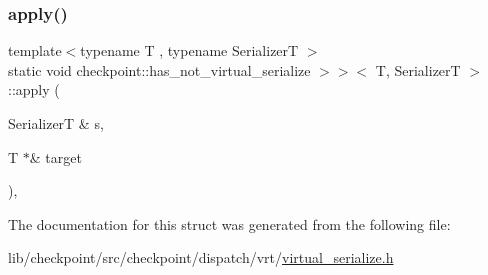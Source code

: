 \subsubsection{\texorpdfstring{apply()}{apply()}}
{\footnotesize\ttfamily template$<$typename T , typename SerializerT $>$ \\
static void checkpoint\+::has\+\_\+not\+\_\+virtual\+\_\+serialize $>$$>$$<$ T, SerializerT $>$\+::apply (\begin{DoxyParamCaption}\item[{SerializerT \&}]{s,  }\item[{T $\ast$\&}]{target }\end{DoxyParamCaption})\hspace{0.3cm}{\ttfamily [inline]}, {\ttfamily [static]}}



The documentation for this struct was generated from the following file\+:\begin{DoxyCompactItemize}
\item 
lib/checkpoint/src/checkpoint/dispatch/vrt/\hyperlink{virtual__serialize_8h}{virtual\+\_\+serialize.\+h}\end{DoxyCompactItemize}
